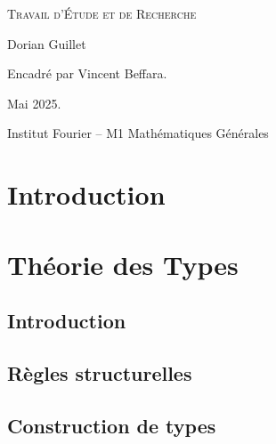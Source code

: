 \documentclass[a4paper, 11pt, twoside]{article}
\title{\Title}
\author{\Author}
\date{\today}
\begin{document}
  \begin{titlepage}
    \thispagestyle{empty}
    \begin{center}
      \vspace*{1cm}

      \large
      \textsc{Travail d'Étude et de Recherche}
      \vspace{1.5cm}

      \huge\textbf{\Title}
      \vspace{2cm}

      \large
      Dorian Guillet
      \vspace{1cm}

      Encadré par Vincent Beffara.

      \vfill
      Mai 2025.
      \vspace{1cm}

      Institut Fourier -- M1 Mathématiques Générales
    \end{center}
  \end{titlepage}

  \newpage
  \tableofcontents
  \thispagestyle{empty}

  \newpage
  \setcounter{page}{1}

  \thispagestyle{plain}
  \section*{Introduction}
    

  \newpage
  \section{Théorie des Types}
    \subsection{Introduction}
      

    \subsection{Règles structurelles}
      

    \subsection{Construction de types}
      
\end{document}
